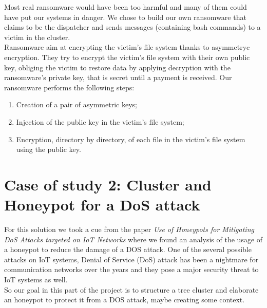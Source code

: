 \noindent Most real ransomware would have been too harmful and many of them could have put our systems in danger. We chose to build our own ransomware that claims to be the dispatcher and sends messages (containing bash commands) to a victim in the cluster. \\
Ransomware aim at encrypting the victim's file system thanks to asymmetryc encryption. They try to encrypt the victim's file system with their own public key, obliging the victim to restore data by applying decryption with the ransomware's private key, that is secret until a payment is received.
Our ransomware performs the following steps:
\begin{enumerate}
  \item Creation of a pair of asymmetric keys;
  \item Injection of the public key in the victim's file system;
  \item Encryption, directory by directory, of each file in the victim's file system using the public key.
\end{enumerate}




\section{Case of study 2: Cluster and Honeypot for a DoS attack}

For this solution we took a cue from the paper \textit{Use of Honeypots for Mitigating DoS Attacks 
targeted on IoT Networks}\cite{7944057} where we found an analysis of the usage of a honeypot to reduce the damage of a DOS attack. One of the several possible attacks on IoT 
systems, Denial of Service (DoS) attack has been a nightmare for 
communication networks over the years and they 
pose a major security threat to IoT systems as well.\\
So our goal in this part of the project is to structure a tree cluster and elaborate an honeypot to protect it from a DOS attack, maybe creating some context.
  
